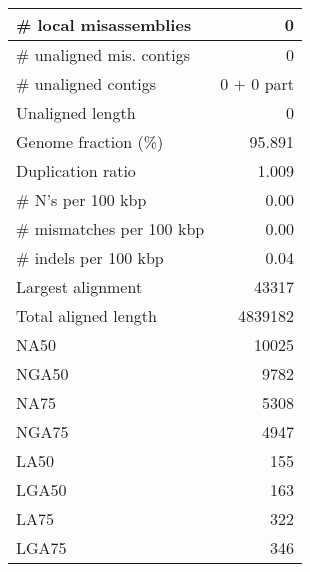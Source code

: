 \documentclass[12pt,a4paper]{article}
\begin{document}
\begin{table}[ht]
\begin{center}
\begin{tabular}{|l*{1}{|r}|}
\# local misassemblies & 0 \\ \hline
\# unaligned mis. contigs & 0 \\ \hline
\# unaligned contigs & 0 + 0 part \\ \hline
Unaligned length & 0 \\ \hline
Genome fraction (\%) & 95.891 \\ \hline
Duplication ratio & 1.009 \\ \hline
\# N's per 100 kbp & 0.00 \\ \hline
\# mismatches per 100 kbp & 0.00 \\ \hline
\# indels per 100 kbp & 0.04 \\ \hline
Largest alignment & 43317 \\ \hline
Total aligned length & 4839182 \\ \hline
NA50 & 10025 \\ \hline
NGA50 & 9782 \\ \hline
NA75 & 5308 \\ \hline
NGA75 & 4947 \\ \hline
LA50 & 155 \\ \hline
LGA50 & 163 \\ \hline
LA75 & 322 \\ \hline
LGA75 & 346 \\ \hline
\end{tabular}
\end{center}
\end{table}
\end{document}
